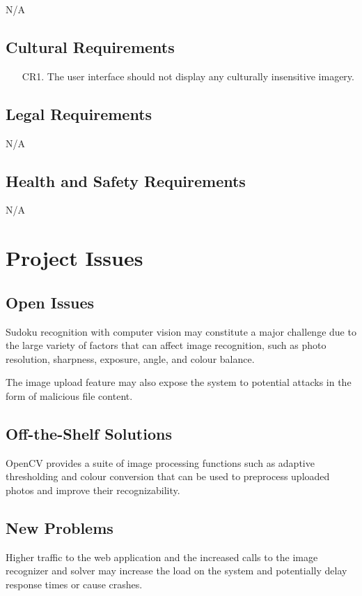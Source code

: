 \documentclass[11pt]{article}
\begin{document}
N/A

\subsection{Cultural Requirements}

\begin{enumerate}
    \item [CR1.] The user interface should not display any culturally insensitive imagery.
\end{enumerate}

\subsection{Legal Requirements}

N/A

\subsection{Health and Safety Requirements}

N/A

\section{Project Issues}

\subsection{Open Issues}
Sudoku recognition with computer vision may constitute a major challenge due to the large variety of factors that can affect image recognition, such as photo resolution, sharpness, exposure, angle, and colour balance. 

The image upload feature may also expose the system to potential attacks in the form of malicious file content.

\subsection{Off-the-Shelf Solutions}
OpenCV provides a suite of image processing functions such as adaptive thresholding and colour conversion that can be used to preprocess uploaded photos and improve their recognizability. 

\subsection{New Problems}
Higher traffic to the web application and the increased calls to the image recognizer and solver may increase the load on the system and potentially delay response times or cause crashes.
\end{document}
